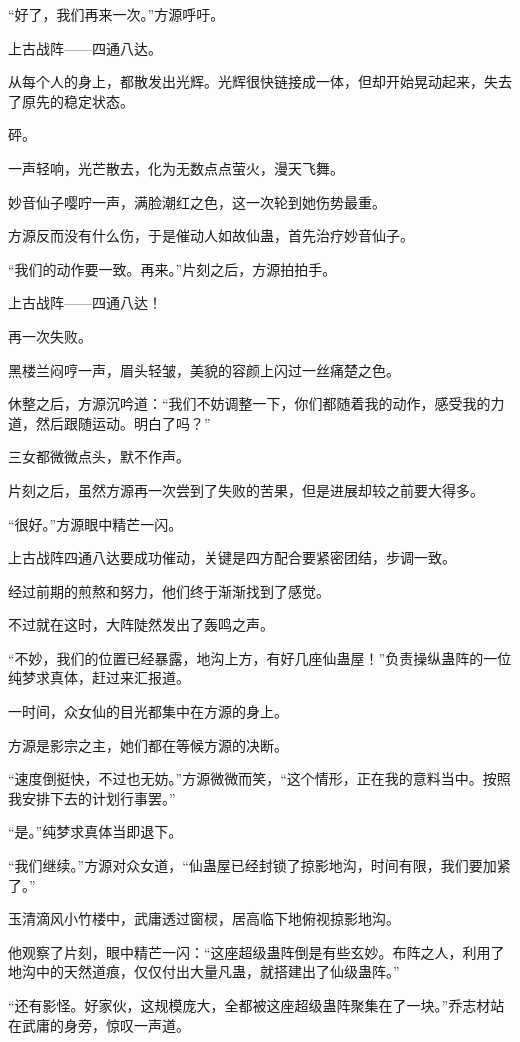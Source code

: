 \begin{this_body}
“好了，我们再来一次。”方源呼吁。

上古战阵——四通八达。

从每个人的身上，都散发出光辉。光辉很快链接成一体，但却开始晃动起来，失去了原先的稳定状态。

砰。

一声轻响，光芒散去，化为无数点点萤火，漫天飞舞。

妙音仙子嘤咛一声，满脸潮红之色，这一次轮到她伤势最重。

方源反而没有什么伤，于是催动人如故仙蛊，首先治疗妙音仙子。

“我们的动作要一致。再来。”片刻之后，方源拍拍手。

上古战阵——四通八达！

再一次失败。

黑楼兰闷哼一声，眉头轻皱，美貌的容颜上闪过一丝痛楚之色。

休整之后，方源沉吟道：“我们不妨调整一下，你们都随着我的动作，感受我的力道，然后跟随运动。明白了吗？”

三女都微微点头，默不作声。

片刻之后，虽然方源再一次尝到了失败的苦果，但是进展却较之前要大得多。

“很好。”方源眼中精芒一闪。

上古战阵四通八达要成功催动，关键是四方配合要紧密团结，步调一致。

经过前期的煎熬和努力，他们终于渐渐找到了感觉。

不过就在这时，大阵陡然发出了轰鸣之声。

“不妙，我们的位置已经暴露，地沟上方，有好几座仙蛊屋！”负责操纵蛊阵的一位纯梦求真体，赶过来汇报道。

一时间，众女仙的目光都集中在方源的身上。

方源是影宗之主，她们都在等候方源的决断。

“速度倒挺快，不过也无妨。”方源微微而笑，“这个情形，正在我的意料当中。按照我安排下去的计划行事罢。”

“是。”纯梦求真体当即退下。

“我们继续。”方源对众女道，“仙蛊屋已经封锁了掠影地沟，时间有限，我们要加紧了。”

玉清滴风小竹楼中，武庸透过窗棂，居高临下地俯视掠影地沟。

他观察了片刻，眼中精芒一闪：“这座超级蛊阵倒是有些玄妙。布阵之人，利用了地沟中的天然道痕，仅仅付出大量凡蛊，就搭建出了仙级蛊阵。”

“还有影怪。好家伙，这规模庞大，全都被这座超级蛊阵聚集在了一块。”乔志材站在武庸的身旁，惊叹一声道。


\end{this_body}
